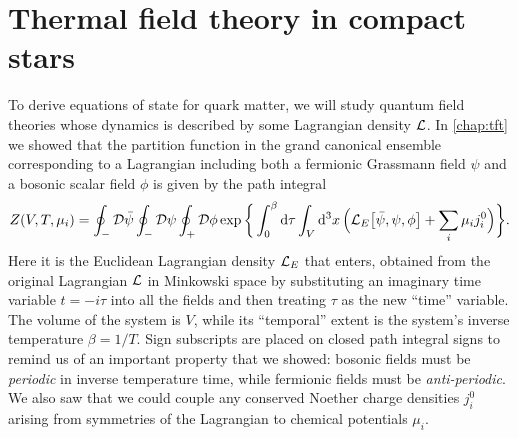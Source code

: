 \section{Thermal field theory in compact stars}
\label{sec:master_intro:tft}

To derive equations of state for quark matter, we will study quantum field theories whose dynamics is described by some Lagrangian density $\mathcal{L}$.
In \cref{chap:tft} we showed that the partition function in the grand canonical ensemble corresponding to a Lagrangian including both a fermionic Grassmann field $\psi$ and a bosonic scalar field $\phi$ is given by the path integral
\begin{equation}
	Z(V, T, \mu_i) = \oint_- \mathcal{D} \bar{\psi} \oint_- \mathcal{D} \psi \oint_+ \mathcal{D} \phi \exp \bigg\{ \int_0^\beta \mathop{}\!\mathrm{d} \tau \int_V \mathop{}\!\mathrm{d}^3 x \, \Big( \mathcal{L}_E\big[\bar{\psi}, \psi, \phi\big] + \sum_i \mu_i j^0_i \Big) \bigg\}.
\label{eq:master_intro:partition_function}
\end{equation}
Here it is the Euclidean Lagrangian density $\mathcal{L}_E$ that enters,
obtained from the original Lagrangian $\mathcal{L}$ in Minkowski space by substituting an imaginary time variable $t = -i \tau$ into all the fields and then treating $\tau$ as the new ``time'' variable.
The volume of the system is $V$, while its ``temporal'' extent is the system's inverse temperature $\beta = 1/T$.
Sign subscripts are placed on closed path integral signs to remind us of an important property that we showed: bosonic fields must be \emph{periodic} in inverse temperature time, while fermionic fields must be \emph{anti-periodic}.
We also saw that we could couple any conserved Noether charge densities $j^0_i$ arising from symmetries of the Lagrangian to chemical potentials $\mu_i$.

